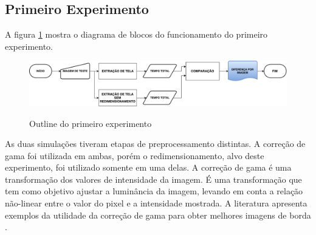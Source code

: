 \subsection{Primeiro Experimento}

A figura \ref{fig:exptempo} mostra o diagrama de blocos do funcionamento do primeiro experimento.


\begin{figure} [h]
\centering
	\includegraphics[width = \textwidth]{figuras/experimento_tempo.pdf} \label{fig:exptempo} \caption{Outline do primeiro experimento}
\end{figure} 

As duas simulações tiveram etapas de preprocessamento distintas. A correção de gama foi utilizada em ambas, porém o redimensionamento, alvo deste experimento, foi utilizado somente em uma delas.
A correção de gama é uma transformação dos valores de intensidade da imagem. É uma transformação que tem como objetivo ajustar a luminância da imagem, levando em conta a relação não-linear entre o valor do pixel e a intensidade mostrada. A literatura apresenta exemplos da utilidade da correção de gama para obter melhores imagens de borda \cite{corrgamma00,corrgamma01}.

